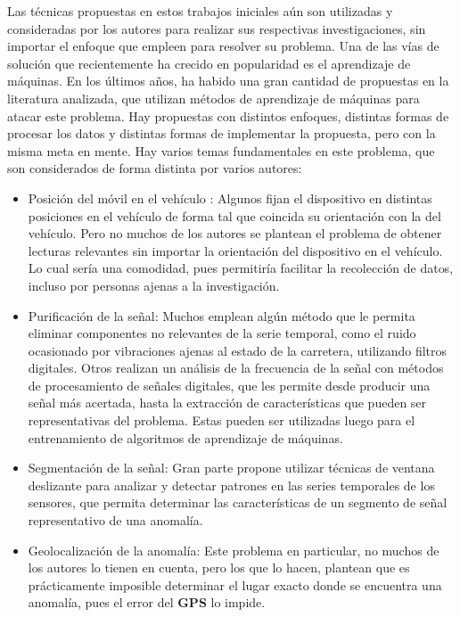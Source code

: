 	Las técnicas propuestas en estos trabajos iniciales aún son utilizadas y consideradas por los autores para realizar sus respectivas investigaciones,
	sin importar el enfoque que empleen para resolver su problema. Una de las vías de solución que recientemente ha crecido en popularidad es el aprendizaje
	de máquinas. En los últimos años, ha habido una gran cantidad de propuestas en la literatura analizada, que utilizan métodos de aprendizaje de máquinas
	para atacar este problema. Hay propuestas con distintos enfoques, distintas formas de procesar los datos y distintas formas de implementar la propuesta,
	pero con la misma meta en mente. Hay varios temas fundamentales en este problema, que son considerados de forma distinta por varios autores:

	\begin{itemize}
		\item Posición del móvil en el vehículo : Algunos fijan el dispositivo en distintas posiciones en el vehículo de forma tal que coincida su orientación
			con la del vehículo. Pero no muchos de los autores se plantean el problema de obtener lecturas relevantes sin importar la orientación del
			dispositivo en el vehículo. Lo cual sería una comodidad, pues permitiría facilitar la recolección de datos, incluso por personas ajenas a la
			investigación.

		\item Purificación de la señal: Muchos emplean algún método que le permita eliminar componentes no relevantes de la serie temporal, como
			el ruido ocasionado por vibraciones ajenas al estado de la carretera, utilizando filtros digitales. Otros realizan un análisis de la frecuencia
			de la señal con métodos de procesamiento de señales digitales, que les permite desde producir una señal más acertada, hasta la extracción de
			características que pueden ser representativas del problema. Estas pueden ser utilizadas luego para el entrenamiento de algoritmos de aprendizaje
			de máquinas.

		\item Segmentación de la señal: Gran parte propone utilizar técnicas de ventana deslizante para analizar y detectar
			patrones en las series temporales de los sensores, que permita determinar las características de un segmento de señal representativo de
			una anomalía.

		\item Geolocalización de la anomalía: Este problema en particular, no muchos de los autores lo tienen en cuenta, pero los que lo hacen, plantean
			que es prácticamente imposible determinar el lugar exacto donde se encuentra una anomalía, pues el error del \textbf{GPS} lo impide. 


\end{itemize}
